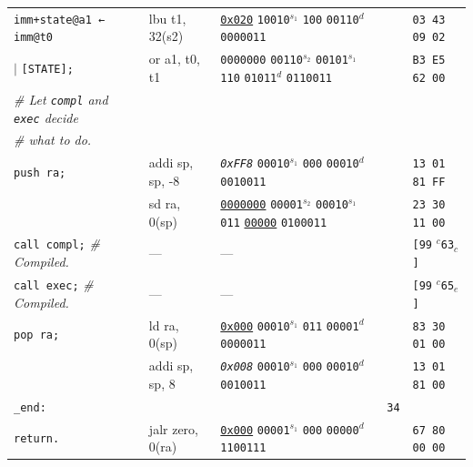 \documentclass[a4paper,12pt,final]{article}
\begin{document}
\begin{table}[!htbp]
\begin{adjustwidth}{-1cm}{-1cm}
\begin{center}
\begin{tabular}{l|ll|l|l}
\hspace{1.053000em} \texttt{imm+state@a1 ← imm@t0} & lbu t1, 32(s2) & \uline{\texttt{0x020}}                    \texttt{10010}​\(^{s_{1}}\) \texttt{100} \texttt{00110}​\(^{d}\)  \texttt{0000011} &  & \texttt{03 43 09 02}\\[0pt]
\hspace{7.897500em}              \(\vert{}\) \texttt{[STATE];} & or a1, t0, t1 & \texttt{0000000} \texttt{00110}​\(^{s_{2}}\) \texttt{00101}​\(^{s_{1}}\) \texttt{110} \texttt{01011}​\(^{d}\)  \texttt{0110011} &  & \texttt{B3 E5 62 00}\\[0pt]
\hspace{1.053000em} \emph{\# Let \texttt{compl} and \texttt{exec} decide} &  &  &  & \\[0pt]
\hspace{1.053000em} \emph{\# what to do.} &  &  &  & \\[0pt]
\hspace{1.053000em} \texttt{push ra;} & addi sp, sp, -8 & \emph{\texttt{0xFF8}}                    \texttt{00010}​\(^{s_{1}}\) \texttt{000} \texttt{00010}​\(^{d}\)  \texttt{0010011} &  & \texttt{13 01 81 FF}\\[0pt]
\hspace{1.053000em} & sd ra, 0(sp) & \uline{\texttt{0000000}} \texttt{00001}​\(^{s_{2}}\) \texttt{00010}​\(^{s_{1}}\) \texttt{011} \uline{\texttt{00000}} \texttt{0100011} &  & \texttt{23 30 11 00}\\[0pt]
\hspace{1.053000em} \texttt{call compl;}  \hspace{0.000000em}​\emph{\# Compiled.} & --- & --- &  & \texttt{[99} \(^{c}\)​\texttt{63}​\(_{c}\)​\texttt{]}\\[0pt]
\hspace{1.053000em} \texttt{call exec;}   \hspace{0.526500em}​\emph{\# Compiled.} & --- & --- &  & \texttt{[99} \(^{c}\)​\texttt{65}​\(_{e}\)​\texttt{]}\\[0pt]
\hspace{1.053000em} \texttt{pop ra;} & ld ra, 0(sp) & \uline{\texttt{0x000}}                    \texttt{00010}​\(^{s_{1}}\) \texttt{011} \texttt{00001}​\(^{d}\)  \texttt{0000011} &  & \texttt{83 30 01 00}\\[0pt]
\hspace{1.053000em} & addi sp, sp, 8 & \emph{\texttt{0x008}}                    \texttt{00010}​\(^{s_{1}}\) \texttt{000} \texttt{00010}​\(^{d}\)  \texttt{0010011} &  & \texttt{13 01 81 00}\\[0pt]
\texttt{\_end:} &  &  & \texttt{34} & \\[0pt]
\hspace{1.053000em} \texttt{return.} & jalr zero, 0(ra) & \uline{\texttt{0x000}}                    \texttt{00001}​\(^{s_{1}}\) \texttt{000} \texttt{00000}​\(^{d}\)  \texttt{1100111} &  & \texttt{67 80 00 00}\\[0pt]
\end{tabular}


\end{center}
\end{adjustwidth}
\end{table}
\end{document}
